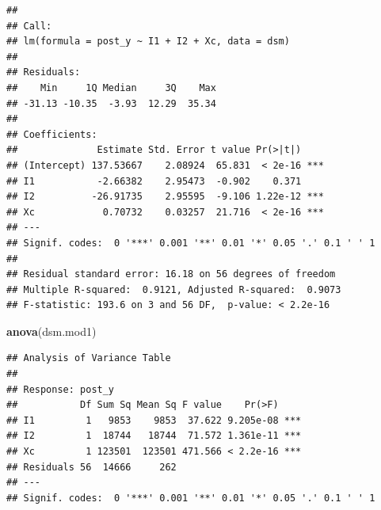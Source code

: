 \documentclass[
]{book}
\newenvironment{Shaded}{\begin{snugshade}}{\end{snugshade}}
\newcommand{\ControlFlowTok}[1]{\textcolor[rgb]{0.13,0.29,0.53}{\textbf{#1}}}
\newcommand{\DecValTok}[1]{\textcolor[rgb]{0.00,0.00,0.81}{#1}}
\newcommand{\FunctionTok}[1]{\textcolor[rgb]{0.13,0.29,0.53}{\textbf{#1}}}
\newcommand{\NormalTok}[1]{#1}
\newcommand{\OtherTok}[1]{\textcolor[rgb]{0.56,0.35,0.01}{#1}}
\newcommand{\SpecialCharTok}[1]{\textcolor[rgb]{0.81,0.36,0.00}{\textbf{#1}}}
\begin{document}
\begin{verbatim}
## 
## Call:
## lm(formula = post_y ~ I1 + I2 + Xc, data = dsm)
## 
## Residuals:
##    Min     1Q Median     3Q    Max 
## -31.13 -10.35  -3.93  12.29  35.34 
## 
## Coefficients:
##              Estimate Std. Error t value Pr(>|t|)    
## (Intercept) 137.53667    2.08924  65.831  < 2e-16 ***
## I1           -2.66382    2.95473  -0.902    0.371    
## I2          -26.91735    2.95595  -9.106 1.22e-12 ***
## Xc            0.70732    0.03257  21.716  < 2e-16 ***
## ---
## Signif. codes:  0 '***' 0.001 '**' 0.01 '*' 0.05 '.' 0.1 ' ' 1
## 
## Residual standard error: 16.18 on 56 degrees of freedom
## Multiple R-squared:  0.9121, Adjusted R-squared:  0.9073 
## F-statistic: 193.6 on 3 and 56 DF,  p-value: < 2.2e-16
\end{verbatim}

\begin{Shaded}
\begin{Highlighting}[]
\FunctionTok{anova}\NormalTok{(dsm.mod1)}
\end{Highlighting}
\end{Shaded}

\begin{verbatim}
## Analysis of Variance Table
## 
## Response: post_y
##           Df Sum Sq Mean Sq F value    Pr(>F)    
## I1         1   9853    9853  37.622 9.205e-08 ***
## I2         1  18744   18744  71.572 1.361e-11 ***
## Xc         1 123501  123501 471.566 < 2.2e-16 ***
## Residuals 56  14666     262                      
## ---
## Signif. codes:  0 '***' 0.001 '**' 0.01 '*' 0.05 '.' 0.1 ' ' 1
\end{verbatim}

\begin{Shaded}
\end{Shaded}
\end{document}
